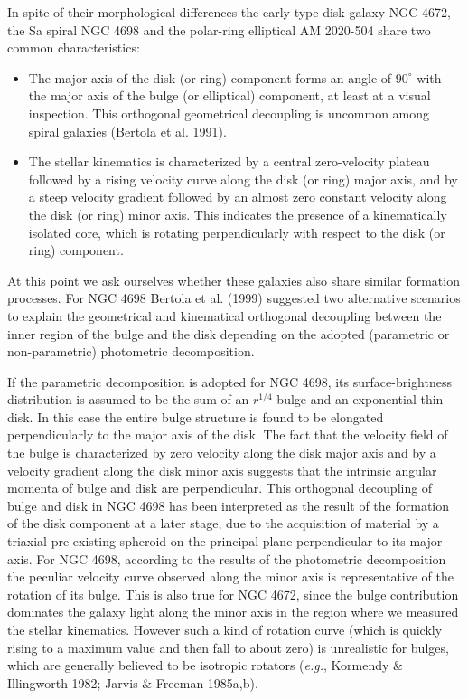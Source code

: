 \documentclass[twocolumns]{aa}
\begin{document}
\bigskip 

In spite of their morphological differences the early-type disk galaxy
NGC 4672, the Sa spiral NGC 4698 and the polar-ring elliptical AM
2020-504 share two common characteristics:

\begin{itemize}

\item[{\it (i)\/}] The major axis of the disk (or ring) component
forms an angle of $90^\circ$ with the major axis of
the bulge (or elliptical) component, at least at a visual inspection. 
This orthogonal geometrical decoupling is uncommon among spiral galaxies
(Bertola et al. 1991).

\item[{\it (ii)\/}] The stellar kinematics is characterized by
a central zero-velocity plateau followed by a rising velocity curve
along the disk (or ring) major axis, and by a steep velocity gradient
followed by an almost zero constant velocity along the disk (or ring)
minor axis. This indicates the presence of a kinematically isolated
core, which is rotating perpendicularly with respect to the disk (or
ring) component.

\end{itemize}

\bigskip

At this point we ask ourselves whether these galaxies also share
similar formation processes. For NGC 4698 Bertola et al. (1999)
suggested two alternative scenarios to explain the geometrical and
kinematical orthogonal decoupling between the inner region of the
bulge and the disk depending on the adopted (parametric or
non-parame\-tric) photometric decomposition.

If the parametric decomposition is adopted for NGC 4698, its
surface-brightness distribution is assumed to be the sum of an
$r^{1/4}$ bulge and an exponential thin disk. In this case the entire
bulge structure is found to be elongated perpendicularly to the major
axis of the disk.  The fact that the velocity field of the bulge is
characterized by zero velocity along the disk major axis and by a
velocity gradient along the disk minor axis suggests that the
intrinsic angular momenta of bulge and disk are perpendicular.  This
orthogonal decoupling of bulge and disk in NGC 4698 has been
interpreted  as the result of the formation of the disk component
at a later stage, due to the acquisition of material by a triaxial
pre-existing spheroid on the principal plane perpendicular to its
major axis.  For NGC 4698, according to the results of the
photometric decomposition the peculiar velocity curve observed along
the minor axis is representative of the rotation of its
bulge. This is also true for NGC 4672, since the bulge contribution
dominates the galaxy light along the minor axis in the region where we
measured the stellar kinematics.  However such a kind of rotation
curve (which is quickly rising to a maximum value and then fall
to about zero) is unrealistic for bulges, which are generally
believed to be isotropic rotators ({\it e.g.\/}, Kormendy \&
Illingworth 1982; Jarvis \& Freeman 1985a,b).
\end{document}

